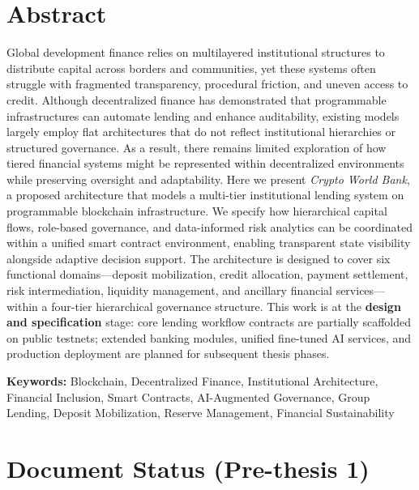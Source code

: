 \documentclass[12pt,a4paper]{report}  %
\begin{document}
\chapter*{Abstract}
{}

Global development finance relies on multilayered institutional structures to distribute capital across borders and communities, yet these systems often struggle with fragmented transparency, procedural friction, and uneven access to credit. Although decentralized finance has demonstrated that programmable infrastructures can automate lending and enhance auditability, existing models largely employ flat architectures that do not reflect institutional hierarchies or structured governance. As a result, there remains limited exploration of how tiered financial systems might be represented within decentralized environments while preserving oversight and adaptability. Here we present \textit{Crypto World Bank}, a proposed architecture that models a multi-tier institutional lending system on programmable blockchain infrastructure. We specify how hierarchical capital flows, role-based governance, and data-informed risk analytics can be coordinated within a unified smart contract environment, enabling transparent state visibility alongside adaptive decision support. The architecture is designed to cover six functional domains---deposit mobilization, credit allocation, payment settlement, risk intermediation, liquidity management, and ancillary financial services---within a four-tier hierarchical governance structure. This work is at the \textbf{design and specification} stage: core lending workflow contracts are partially scaffolded on public testnets; extended banking modules, unified fine-tuned AI services, and production deployment are planned for subsequent thesis phases.

\vspace{0.5em}
\noindent\textbf{Keywords:} Blockchain, Decentralized Finance, Institutional Architecture, Financial Inclusion, Smart Contracts, AI-Augmented Governance, Group Lending, Deposit Mobilization, Reserve Management, Financial Sustainability

\newpage
\thispagestyle{empty}

\chapter*{Document Status (Pre-thesis 1)}
{}
\end{document}
